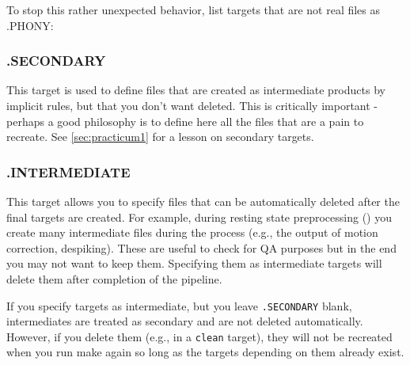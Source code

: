 To stop this rather unexpected behavior, list targets that are not real files as .PHONY:


\subsubsection{.SECONDARY}
This target is used to define files that are created as intermediate products by implicit rules, but that you don't want deleted. This is critically important - perhaps a good philosophy is to define here all the files that are a pain to recreate. See \autoref{sec:practicum1} for a lesson on secondary targets. 

\subsubsection{.INTERMEDIATE}
This target allows you to specify files that can be automatically deleted after the final targets are created. For example, during resting state preprocessing () you create many intermediate files during the process (e.g., the output of motion correction, despiking). These are useful to check for QA purposes but in the end you may not want to keep them. Specifying them as intermediate targets will delete them after completion of the pipeline.

If you specify targets as intermediate, but you leave \texttt{.SECONDARY} blank, intermediates are treated as secondary and are not deleted automatically.  However, if you delete them (e.g., in a \texttt{clean} target), they will not be recreated when you run make again so long as the targets depending on them already exist.



